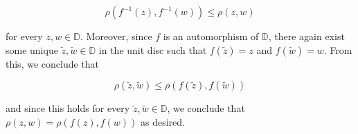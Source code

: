 \begin{solution}
  $$
  \rho(f^{-1}(z), f^{-1}(w)) \le \rho(z, w)
  $$

  for every $z, w \in \mathbb{D}$. Moreover, since $f$ is an automorphism of $\mathbb{D}$, there again exist some unique 
  $\tilde{z}, \tilde{w} \in \mathbb{D}$ in the unit disc such that $f(\tilde{z}) = z$ and $f(\tilde{w}) = w$. From this,
  we conclude that

  $$
  \rho(\tilde{z}, \tilde{w}) \le \rho(f(\tilde{z}), f(\tilde{w}))
  $$

  and since this holds for every $\tilde{z}, \tilde{w} \in \mathbb{D}$, we conclude that 
  $\rho(z, w) = \rho(f(z), f(w))$ as desired.
  \ \\
\end{solution}